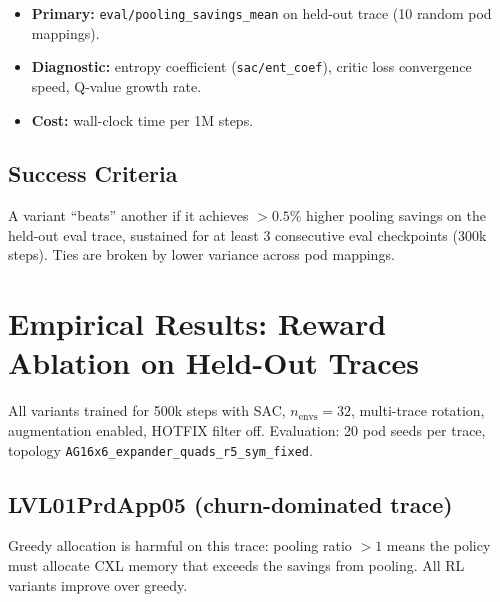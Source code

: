 \documentclass[11pt]{article}
\begin{document}
\begin{itemize}
  \item \textbf{Primary:} \texttt{eval/pooling\_savings\_mean} on held-out
        trace (10 random pod mappings).
  \item \textbf{Diagnostic:} entropy coefficient
        (\texttt{sac/ent\_coef}), critic loss convergence speed, Q-value
        growth rate.
  \item \textbf{Cost:} wall-clock time per 1M steps.
\end{itemize}

\subsection{Success Criteria}

A variant ``beats'' another if it achieves $> 0.5\%$ higher pooling
savings on the held-out eval trace, sustained for at least 3 consecutive
eval checkpoints (300k steps).  Ties are broken by lower variance across
pod mappings.

\section{Empirical Results: Reward Ablation on Held-Out Traces}
\label{sec:results}

All variants trained for 500k steps with SAC, $n_\text{envs}=32$, multi-trace
rotation, augmentation enabled, HOTFIX filter off.
Evaluation: 20 pod seeds per trace, topology \texttt{AG16x6\_expander\_quads\_r5\_sym\_fixed}.

\subsection{LVL01PrdApp05 (churn-dominated trace)}

Greedy allocation is harmful on this trace: pooling ratio $>1$ means
the policy must allocate CXL memory that exceeds the savings from pooling.
All RL variants improve over greedy.
\end{document}
